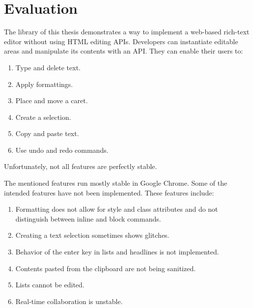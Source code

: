 
\chapter{Evaluation}
\label{ch:evaluation}

The library of this thesis demonstrates a way to implement a web-based rich-text editor without using HTML editing APIs. Developers can instantiate editable areas and manipulate its contents with an API. They can enable their users to:

\begin{enumerate}
\item Type and delete text.
\item Apply formattings.
\item Place and move a caret.
\item Create a selection.
\item Copy and paste text.
\item Use undo and redo commands.
\end{enumerate}

Unfortunately, not all features are perfectly stable. 

The mentioned features run mostly stable in Google Chrome. Some of the intended features have not been implemented. These features include:



\begin{enumerate}
\item Formatting does not allow for style and class attributes and do not distinguish between inline and block commands.
\item Creating a text selection sometimes shows glitches.
\item Behavior of the enter key in lists and headlines is not implemented.
\item Contents pasted from the clipboard are not being sanitized.
\item Lists cannot be edited.
\item Real-time collaboration is unstable.
\end{enumerate}

